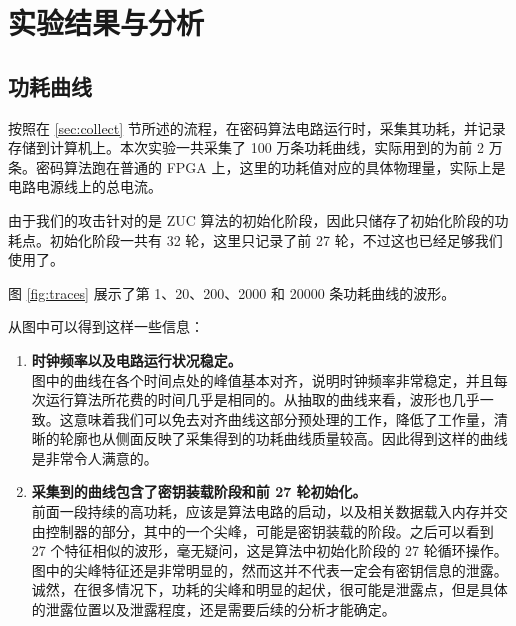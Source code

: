 

\chapter{实验结果与分析}

\label{chap:results}

\section{功耗曲线}

按照在 \ref{sec:collect} 节所述的流程，在密码算法电路运行时，采集其功耗，并记录存储到计算机上。本次实验一共采集了 100 万条功耗曲线，实际用到的为前 2 万条。密码算法跑在普通的 FPGA 上，这里的功耗值对应的具体物理量，实际上是电路电源线上的总电流。 \cite{zuc_fpga} \cite{zuc_fpga_en}

由于我们的攻击针对的是 ZUC 算法的初始化阶段，因此只储存了初始化阶段的功耗点。初始化阶段一共有 32 轮，这里只记录了前 27 轮，不过这也已经足够我们使用了。

\vspace*{\baselineskip}

图 \ref{fig:traces} 展示了第 1、20、200、2000 和 20000 条功耗曲线的波形。

从图中可以得到这样一些信息：

\begin{enumerate}
    \item \textbf{时钟频率以及电路运行状况稳定。}\\
    图中的曲线在各个时间点处的峰值基本对齐，说明时钟频率非常稳定，并且每次运行算法所花费的时间几乎是相同的。从抽取的曲线来看，波形也几乎一致。这意味着我们可以免去对齐曲线这部分预处理的工作，降低了工作量，清晰的轮廓也从侧面反映了采集得到的功耗曲线质量较高。因此得到这样的曲线是非常令人满意的。
    \item \textbf{采集到的曲线包含了密钥装载阶段和前 27 轮初始化。}\\
    前面一段持续的高功耗，应该是算法电路的启动，以及相关数据载入内存并交由控制器的部分，其中的一个尖峰，可能是密钥装载的阶段。之后可以看到 27 个特征相似的波形，毫无疑问，这是算法中初始化阶段的 27 轮循环操作。图中的尖峰特征还是非常明显的，然而这并不代表一定会有密钥信息的泄露。诚然，在很多情况下，功耗的尖峰和明显的起伏，很可能是泄露点，但是具体的泄露位置以及泄露程度，还是需要后续的分析才能确定。
\end{enumerate}

